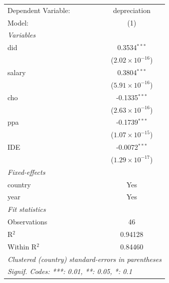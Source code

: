 \begingroup
\centering
\begin{tabular}{lc}
   \tabularnewline \midrule \midrule
   Dependent Variable: & depreciation\\  
   Model:              & (1)\\  
   \midrule
   \emph{Variables}\\
   did                 & 0.3534$^{***}$\\   
                       & ($2.02\times 10^{-16}$)\\    
   salary              & 0.3804$^{***}$\\   
                       & ($5.91\times 10^{-16}$)\\    
   cho                 & -0.1335$^{***}$\\   
                       & ($2.63\times 10^{-16}$)\\    
   ppa                 & -0.1739$^{***}$\\   
                       & ($1.07\times 10^{-15}$)\\    
   IDE                 & -0.0072$^{***}$\\   
                       & ($1.29\times 10^{-17}$)\\    
   \midrule
   \emph{Fixed-effects}\\
   country             & Yes\\  
   year                & Yes\\  
   \midrule
   \emph{Fit statistics}\\
   Observations        & 46\\  
   R$^2$               & 0.94128\\  
   Within R$^2$        & 0.84460\\  
   \midrule \midrule
   \multicolumn{2}{l}{\emph{Clustered (country) standard-errors in parentheses}}\\
   \multicolumn{2}{l}{\emph{Signif. Codes: ***: 0.01, **: 0.05, *: 0.1}}\\
\end{tabular}
\par\endgroup

